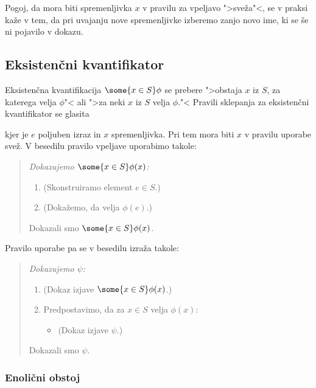 Pogoj, da mora biti spremenljivka $x$ v pravilu za vpeljavo ">sveža"<,
se v praksi kaže v tem, da pri uvajanju nove spremenljivke izberemo
zanjo novo ime, ki se še ni pojavilo v dokazu.


\subsection{Eksistenčni kvantifikator}
\label{sec:eksistencni-kvantifikator}

Eksistenčna kvantifikacija $\some{x \in S} \phi$ se prebere ">obstaja
$x$ iz $S$, za katerega velja $\phi$"< ali ">za neki $x$ iz $S$ velja
$\phi$."< Pravili sklepanja za eksistenčni kvantifikator se glasita
%
%
kjer je $e$ poljuben izraz in $x$ spremenljivka. Pri tem mora biti $x$
v pravilu uporabe svež. V besedilu pravilo vpeljave uporabimo takole:
%
\begin{quote}
  \it
  Dokazujemo $\some{x \in S} \phi(x)$:
  \begin{enumerate}
  \item (Skonstruiramo element $e \in S$.)
  \item (Dokažemo, da velja $\phi(e)$.)
  \end{enumerate}
  Dokazali smo $\some{x \in S} \phi(x)$.
\end{quote}
%
Pravilo uporabe pa se v besedilu izraža takole:
%
\begin{quote}
  \it
  Dokazujemo $\psi$:
  \begin{enumerate}
  \item (Dokaz izjave $\some{x \in S} \phi(x)$.)
  \item Predpostavimo, da za $x \in S$ velja $\phi(x)$:
    \begin{itemize}
    \item[] (Dokaz izjave $\psi$.)
    \end{itemize}
  \end{enumerate}
  Dokazali smo $\psi$.
\end{quote}

\subsubsection{Enolični obstoj}
\label{sec:enolicni-obstoj}

